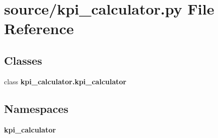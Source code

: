 \section{source/kpi\+\_\+calculator.py File Reference}
\label{kpi__calculator_8py}
\subsection*{Classes}
\begin{DoxyCompactItemize}
\item 
class \textbf{ kpi\+\_\+calculator.\+kpi\+\_\+calculator}
\end{DoxyCompactItemize}
\subsection*{Namespaces}
\begin{DoxyCompactItemize}
\item 
 \textbf{ kpi\+\_\+calculator}
\end{DoxyCompactItemize}

